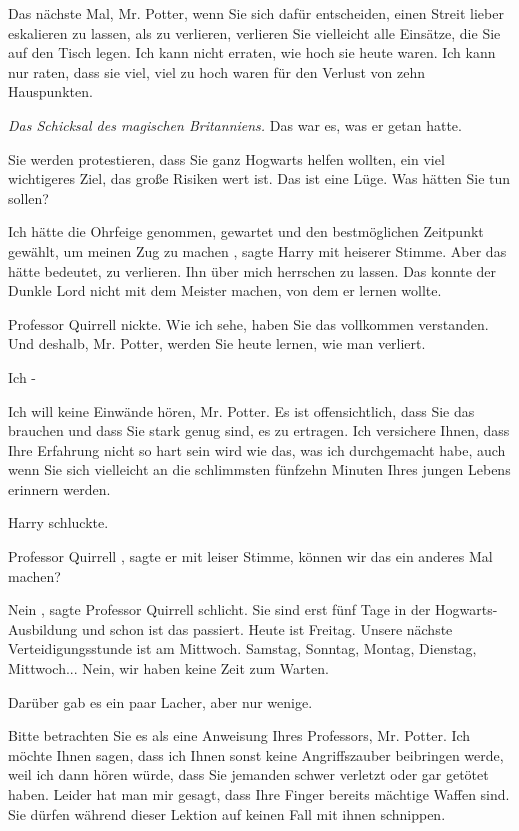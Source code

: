 \glqq Das nächste Mal, Mr. Potter, wenn Sie sich dafür entscheiden, einen Streit
lieber eskalieren zu lassen, als zu verlieren, verlieren Sie vielleicht alle
Einsätze, die Sie auf den Tisch legen. Ich kann nicht erraten, wie hoch sie
heute waren. Ich kann nur raten, dass sie viel, viel zu hoch waren für den
Verlust von zehn Hauspunkten.\grqq{}

\emph{Das Schicksal des magischen Britanniens.}
Das war es, was er getan hatte.

\glqq Sie werden protestieren, dass Sie ganz Hogwarts helfen wollten, ein viel
wichtigeres Ziel, das große Risiken wert ist. Das ist eine Lüge. Was hätten Sie
tun sollen?\grqq{}

\glqq Ich hätte die Ohrfeige genommen, gewartet und den bestmöglichen Zeitpunkt
gewählt, um meinen Zug zu machen\grqq{} , sagte Harry mit heiserer Stimme. \glqq
Aber das hätte bedeutet, zu verlieren. Ihn über mich herrschen zu lassen. Das
konnte der Dunkle Lord nicht mit dem Meister machen, von dem er lernen
wollte.\grqq{}

Professor Quirrell nickte. \glqq Wie ich sehe, haben Sie das vollkommen
verstanden. Und deshalb, Mr. Potter, werden Sie heute lernen, wie man
verliert.\grqq{}

\glqq Ich -\grqq{}

\glqq Ich will keine Einwände hören, Mr. Potter. Es ist offensichtlich, dass Sie
das brauchen und dass Sie stark genug sind, es zu ertragen. Ich versichere
Ihnen, dass Ihre Erfahrung nicht so hart sein wird wie das, was ich durchgemacht
habe, auch wenn Sie sich vielleicht an die schlimmsten fünfzehn Minuten Ihres
jungen Lebens erinnern werden.\grqq{}

Harry schluckte.

\glqq Professor Quirrell\grqq{} , sagte er mit leiser Stimme, \glqq können wir
das ein anderes Mal machen?\grqq{}

\glqq Nein\grqq{} , sagte Professor Quirrell schlicht. \glqq Sie sind erst fünf
Tage in der Hogwarts-Ausbildung und schon ist das passiert. Heute ist Freitag.
Unsere nächste Verteidigungsstunde ist am Mittwoch. Samstag, Sonntag, Montag,
Dienstag, Mittwoch... Nein, wir haben keine Zeit zum Warten.\grqq{}

Darüber gab es ein paar Lacher, aber nur wenige.

\glqq Bitte betrachten Sie es als eine Anweisung Ihres Professors, Mr. Potter.
Ich möchte Ihnen sagen, dass ich Ihnen sonst keine Angriffszauber beibringen
werde, weil ich dann hören würde, dass Sie jemanden schwer verletzt oder gar
getötet haben. Leider hat man mir gesagt, dass Ihre Finger bereits mächtige
Waffen sind. Sie dürfen während dieser Lektion auf keinen Fall mit ihnen
schnippen.\grqq{}

